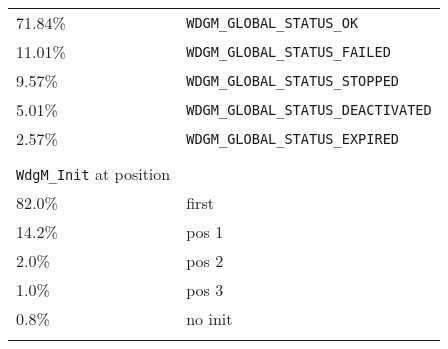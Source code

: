 \begin{longtable}{l l}
71.84\% & \verb!WDGM_GLOBAL_STATUS_OK!\\
11.01\% & \verb!WDGM_GLOBAL_STATUS_FAILED!\\
9.57\% & \verb!WDGM_GLOBAL_STATUS_STOPPED!\\
5.01\% & \verb!WDGM_GLOBAL_STATUS_DEACTIVATED!\\
2.57\% & \verb!WDGM_GLOBAL_STATUS_EXPIRED!\\\\

\verb!WdgM_Init! at position\\
82.0\% & first\\
14.2\% & pos 1\\
2.0\% & pos 2\\
1.0\% & pos 3\\
0.8\% & no init\\\\


\end{longtable}
